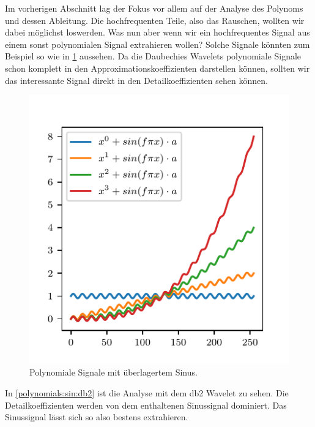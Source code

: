 \begin{refsection}
Im vorherigen Abschnitt lag der Fokus vor allem auf der Analyse des Polynoms
und dessen Ableitung. Die hochfrequenten Teile, also das Rauschen, wollten wir
dabei möglichst loswerden. Was nun aber wenn wir ein hochfrequentes Signal aus
einem sonst polynomialen Signal extrahieren wollen? Solche Signale könnten zum
Beispiel so wie in \cref{polynomials:sin:signals} aussehen. Da die Daubechies
Wavelets polynomiale Signale schon komplett in den Approximationskoeffizienten
darstellen können, sollten wir das interessante Signal direkt in den
Detailkoeffizienten sehen können.

\begin{figure}
    \centering
    \includegraphics{papers/polynomials/images/polynomials_sin_signals.pdf}
    \caption{Polynomiale Signale mit überlagertem Sinus.\label{polynomials:sin:signals}}
\end{figure}

In \cref{polynomials:sin:db2} ist die Analyse mit dem db2 Wavelet zu sehen. Die
Detailkoeffizienten werden von dem enthaltenen Sinussignal dominiert. Das
Sinussignal lässt sich so also bestens extrahieren.


\end{refsection}
